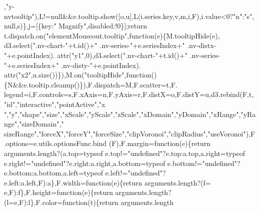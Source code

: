 \begin{DoxyCode}
      ,\textcolor{stringliteral}{"y-nvtooltip"}),L!=null&&e.tooltip.show([o,u],L(i.series.key,v,m,i,F),i.value<0?\textcolor{stringliteral}{"n"}:\textcolor{stringliteral}{"s"},null,s)\},j=[\{key:\textcolor{stringliteral}{"
      Magnify"},disabled:!0\}];\textcolor{keywordflow}{return} t.dispatch.on(\textcolor{stringliteral}{"elementMouseout.tooltip"},\textcolor{keyword}{function}(e)\{M.tooltipHide(e),
      d3.select(\textcolor{stringliteral}{".nv-chart-"}+t.id()+\textcolor{stringliteral}{" .nv-series-"}+e.seriesIndex+\textcolor{stringliteral}{" .nv-distx-"}+e.pointIndex).
      attr(\textcolor{stringliteral}{"y1"},0),d3.select(\textcolor{stringliteral}{".nv-chart-"}+t.id()+\textcolor{stringliteral}{" .nv-series-"}+e.seriesIndex+\textcolor{stringliteral}{" .nv-disty-"}+e.pointIndex).
      attr(\textcolor{stringliteral}{"x2"},u.size())\}),M.on(\textcolor{stringliteral}{"tooltipHide"},\textcolor{keyword}{function}()\{N&&e.tooltip.cleanup()\}),F.dispatch=M,F.scatter=t,F.
      legend=i,F.controls=s,F.xAxis=n,F.yAxis=r,F.distX=o,F.distY=u,d3.rebind(F,t,\textcolor{stringliteral}{"id"},\textcolor{stringliteral}{"interactive"},\textcolor{stringliteral}{"pointActive"},\textcolor{stringliteral}{"x
      "},\textcolor{stringliteral}{"y"},\textcolor{stringliteral}{"shape"},\textcolor{stringliteral}{"size"},\textcolor{stringliteral}{"xScale"},\textcolor{stringliteral}{"yScale"},\textcolor{stringliteral}{"zScale"},\textcolor{stringliteral}{"xDomain"},\textcolor{stringliteral}{"yDomain"},\textcolor{stringliteral}{"xRange"},\textcolor{stringliteral}{"yRange"},\textcolor{stringliteral}{"sizeDomain"},\textcolor{stringliteral}{"
      sizeRange"},\textcolor{stringliteral}{"forceX"},\textcolor{stringliteral}{"forceY"},\textcolor{stringliteral}{"forceSize"},\textcolor{stringliteral}{"clipVoronoi"},\textcolor{stringliteral}{"clipRadius"},\textcolor{stringliteral}{"useVoronoi"}),F.options=e.utils.optionsFunc.bind
      (F),F.margin=\textcolor{keyword}{function}(e)\{\textcolor{keywordflow}{return} arguments.length?(a.top=typeof e.top!=\textcolor{stringliteral}{"undefined"}?e.top:a.top,a.right=typeof
       e.right!=\textcolor{stringliteral}{"undefined"}?e.right:a.right,a.bottom=typeof e.bottom!=\textcolor{stringliteral}{"undefined"}?e.bottom:a.bottom,a.left=typeof 
      e.left!=\textcolor{stringliteral}{"undefined"}?e.left:a.left,F):a\},F.width=\textcolor{keyword}{function}(e)\{\textcolor{keywordflow}{return} arguments.length?(f=
      e,F):f\},F.height=\textcolor{keyword}{function}(e)\{\textcolor{keywordflow}{return} arguments.length?(l=e,F):l\},F.color=\textcolor{keyword}{function}(t)\{\textcolor{keywordflow}{return} arguments.length

\end{DoxyCode}
